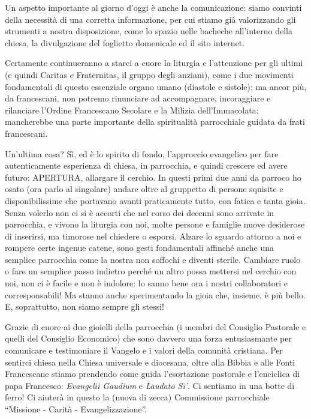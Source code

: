 Un aspetto importante al giorno d'oggi è anche la comunicazione: siamo convinti della necessità di una corretta
informazione, per cui stiamo già valorizzando gli strumenti a nostra disposizione, come lo spazio nelle bacheche all'interno della chiesa, la divulgazione del foglietto domenicale ed il sito internet.

Certamente continueranno a starci a cuore la liturgia e l’attenzione per gli ultimi (e quindi 
Caritas e Fraternitas, il gruppo degli anziani), come i due movimenti fondamentali di questo 
essenziale organo umano (diastole e sistole); ma ancor più, da francescani, non potremo rinunciare 
ad accompagnare, incoraggiare e rilanciare l’Ordine Francescano Secolare e la Milizia 
dell’Immacolata: mancherebbe una parte importante della spiritualità parrocchiale guidata da frati 
francescani.

Un’ultima cosa? Sì, ed è lo spirito di fondo, l’approccio evangelico per fare autenticamente 
esperienza di chiesa, in parrocchia, e quindi crescere ed avere futuro: APERTURA, allargare il 
cerchio. In questi primi due anni da parroco ho osato (ora parlo al singolare) andare oltre al 
gruppetto di persone squisite e disponibilissime che portavano avanti praticamente tutto, con fatica 
e tanta gioia. Senza volerlo non ci si è accorti che nel corso dei decenni sono arrivate in parrocchia, 
e vivono la liturgia con noi, molte persone e famiglie nuove desiderose di inserirsi, ma timorose nel 
chiedere o esporsi. Alzare lo sguardo attorno a noi e rompere certe ingenue catene, sono gesti 
fondamentali affinché anche una semplice parrocchia come la nostra non soffochi e diventi sterile. 
Cambiare ruolo o fare un semplice passo indietro perché un altro possa mettersi nel cerchio con noi, 
non ci è facile e non è indolore: lo sanno bene ora i nostri collaboratori e corresponsabili! Ma stanno 
anche sperimentando la gioia che, insieme, è più bello. E, soprattutto, non siamo sempre gli stessi!

Grazie di cuore ai due gioielli della parrocchia (i membri del Consiglio Pastorale e quelli del 
Consiglio Economico) che sono davvero una forza entusiasmante per comunicare e testimoniare il 
Vangelo e i valori della comunità cristiana. Per sentirci chiesa nella Chiesa universale e diocesana, 
oltre alla Bibbia e alle Fonti Francescane stiamo prendendo come guida l’esortazione pastorale e 
l’enciclica di papa Francesco: \textit{Evangelii Gaudium} e \textit{Laudato Si’}. Ci sentiamo in una botte di ferro! 
Ci aiuterà in questo la (nuova di zecca) Commissione parrocchiale “Missione - Carità - 
Evangelizzazione”.

